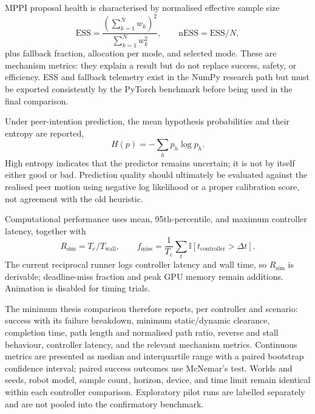 \documentclass[11pt,a4paper]{article}
\begin{document}
MPPI proposal health is characterised by normalised effective sample size
\begin{equation}
 \mathrm{ESS}=\frac{(\sum_{k=1}^{N}w_k)^2}{\sum_{k=1}^{N}w_k^2},
 \qquad \mathrm{nESS}=\mathrm{ESS}/N,
 \label{eq:benchmark-ess}
\end{equation}
plus fallback fraction, allocation per mode, and selected mode.  These are
mechanism metrics: they explain a result but do not replace success, safety,
or efficiency.  ESS and fallback telemetry exist in the NumPy research path
but must be exported consistently by the PyTorch benchmark before being used
in the final comparison.

Under peer-intention prediction, the mean hypothesis probabilities and their
entropy are reported,
\begin{equation}
 H(p)=-\sum_h p_h\log p_h .
 \label{eq:benchmark-entropy}
\end{equation}
High entropy indicates that the predictor remains uncertain; it is not by
itself either good or bad.  Prediction quality should ultimately be evaluated
against the realised peer motion using negative log likelihood or a proper
calibration score, not agreement with the old heuristic.

Computational performance uses mean, 95th-percentile, and maximum controller
latency, together with
\begin{equation}
 R_{\mathrm{sim}}=T_e/T_{\mathrm{wall}},
 \qquad
 f_{\mathrm{miss}}=\frac{1}{T_e}\sum_t
 \mathbb I[t_{\mathrm{controller}}>\Delta t].
 \label{eq:benchmark-runtime}
\end{equation}
The current reciprocal runner logs controller latency and wall time, so
$R_{\mathrm{sim}}$ is derivable; deadline-miss fraction and peak GPU memory
remain additions.  Animation is disabled for timing trials.

The minimum thesis comparison therefore reports, per controller and scenario:
success with its failure breakdown, minimum static/dynamic clearance,
completion time, path length and normalised path ratio, reverse and stall
behaviour, controller latency, and the relevant mechanism metrics.  Continuous
metrics are presented as median and interquartile range with a paired
bootstrap confidence interval; paired success outcomes use McNemar's test.
Worlds and seeds, robot model, sample count, horizon, device, and time limit
remain identical within each controller comparison.  Exploratory pilot runs
are labelled separately and are not pooled into the confirmatory benchmark.
\end{document}
